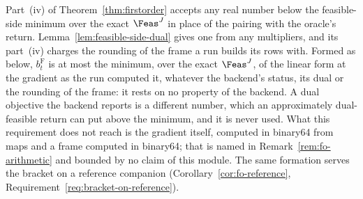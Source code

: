 
Part~(iv) of Theorem~\ref{thm:firstorder} accepts any real number below the
feasible-side minimum over the exact $\Feas^{J}$ in place of the pairing
with the oracle's return. Lemma~\ref{lem:feasible-side-dual} gives one from
any multipliers, and its part~(iv) charges the rounding of the frame a run
builds its rows with. Formed as below, $b^{\mathrm F}_t$ is at most the
minimum, over the exact $\Feas^{J}$, of the linear form at the gradient as
the run computed it, whatever the backend's status, its dual or the
rounding of the frame: it rests on no property of the backend. A dual
objective the backend reports is a different number, which an
approximately dual-feasible return can put above the minimum, and it is
never used. What this requirement does not reach is the gradient itself,
computed in binary64 from maps and a frame computed in binary64; that is
named in Remark~\ref{rem:fo-arithmetic} and bounded by no claim of this
module. The same formation serves the bracket on a reference companion
(Corollary~\ref{cor:fo-reference},
Requirement~\ref{req:bracket-on-reference}).

